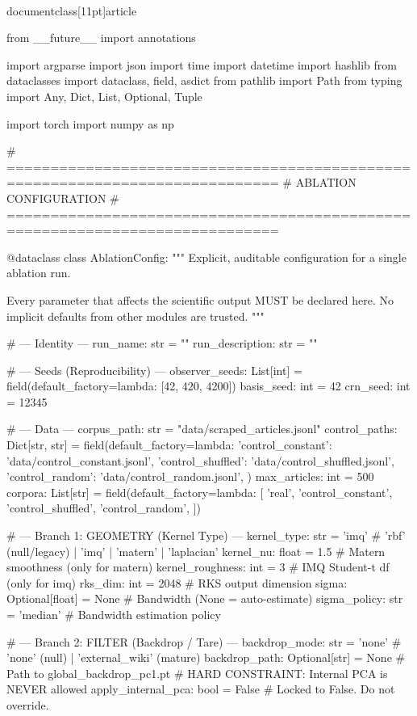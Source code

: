 \\documentclass[11pt]{article}
\begin{document}
\begin{CodeBlock}
from __future__ import annotations

import argparse
import json
import time
import datetime
import hashlib
from dataclasses import dataclass, field, asdict
from pathlib import Path
from typing import Any, Dict, List, Optional, Tuple

import torch
import numpy as np


# =============================================================================
# ABLATION CONFIGURATION
# =============================================================================

@dataclass
class AblationConfig:
    """
    Explicit, auditable configuration for a single ablation run.

    Every parameter that affects the scientific output MUST be declared here.
    No implicit defaults from other modules are trusted.
    """

    # --- Identity ---
    run_name: str = ""
    run_description: str = ""

    # --- Seeds (Reproducibility) ---
    observer_seeds: List[int] = field(default_factory=lambda: [42, 420, 4200])
    basis_seed: int = 42
    crn_seed: int = 12345

    # --- Data ---
    corpus_path: str = "data/scraped_articles.jsonl"
    control_paths: Dict[str, str] = field(default_factory=lambda: {
        'control_constant': 'data/control_constant.jsonl',
        'control_shuffled': 'data/control_shuffled.jsonl',
        'control_random': 'data/control_random.jsonl',
    })
    max_articles: int = 500
    corpora: List[str] = field(default_factory=lambda: [
        'real', 'control_constant', 'control_shuffled', 'control_random',
    ])

    # --- Branch 1: GEOMETRY (Kernel Type) ---
    kernel_type: str = 'imq'         # 'rbf' (null/legacy) | 'imq' | 'matern' | 'laplacian'
    kernel_nu: float = 1.5           # Matern smoothness (only for matern)
    kernel_roughness: int = 3        # IMQ Student-t df (only for imq)
    rks_dim: int = 2048              # RKS output dimension
    sigma: Optional[float] = None    # Bandwidth (None = auto-estimate)
    sigma_policy: str = 'median'     # Bandwidth estimation policy

    # --- Branch 2: FILTER (Backdrop / Tare) ---
    backdrop_mode: str = 'none'      # 'none' (null) | 'external_wiki' (mature)
    backdrop_path: Optional[str] = None  # Path to global_backdrop_pc1.pt
    # HARD CONSTRAINT: Internal PCA is NEVER allowed
    apply_internal_pca: bool = False  # Locked to False. Do not override.


\end{CodeBlock}
\end{document}
